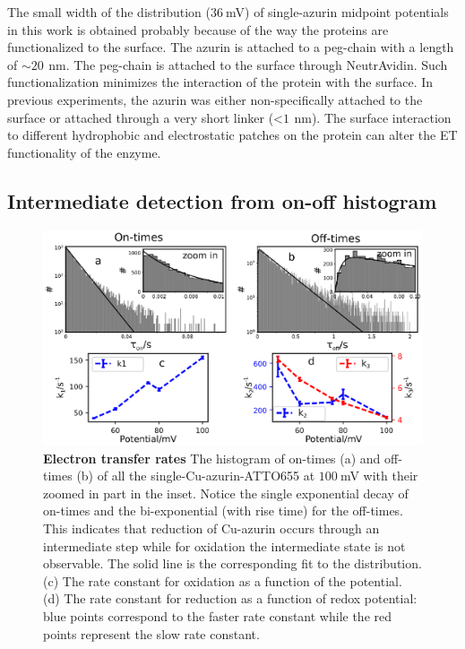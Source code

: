\documentclass[journal=jacsat,manuscript=article]{achemso}
\newcommand{\nm}{\ensuremath{\,\textrm{nm}}}
\begin{document}
The small width of the distribution ($36~$mV) of single-azurin midpoint potentials in this work is obtained probably 
because of the way the proteins are functionalized to the surface. The azurin is attached to a peg-chain with a length 
of ${\sim}20~\nm$. The peg-chain is attached to the surface through NeutrAvidin. Such functionalization minimizes the 
interaction of the protein with the surface. In previous experiments, the azurin was either non-specifically attached 
to the surface or attached through a very short linker (<$1~\nm$). The surface interaction to different hydrophobic and 
electrostatic patches on the protein can alter the ET functionality of the enzyme.
\subsection{Intermediate detection from on-off histogram}
\begin{figure}
	\centering
	\includegraphics[width=\textwidth]{many_sm_hist.eps}
	\caption{\textbf{Electron transfer rates} The histogram of on-times (a) and off-times (b) of all the 
	single-Cu-azurin-ATTO655 at $100~$mV with their zoomed in part in the inset. Notice the single exponential decay 
	of on-times and the bi-exponential (with rise time) for the off-times. This indicates that  reduction of Cu-azurin 
	occurs through an intermediate step while for oxidation the intermediate state is not observable. The solid line 
	is the corresponding fit to the distribution. (c) The rate constant for oxidation as a function of the potential. 
	(d) The rate constant for reduction as a function of redox potential: blue points correspond to the faster rate 
	constant while the red points represent the slow rate constant.}
	\label{fig:many_sm_hist}
\end{figure}
\end{document}
